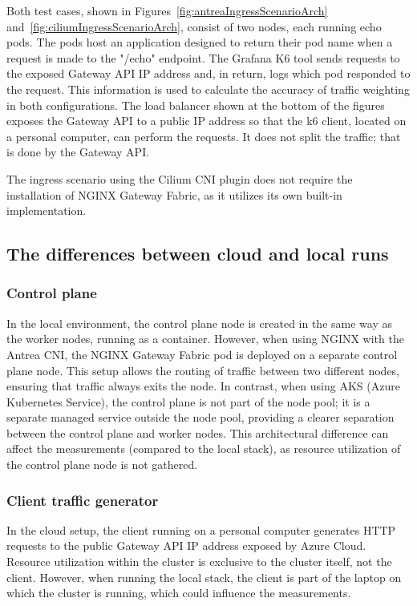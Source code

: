 Both test cases, shown in Figures~\ref{fig:antreaIngressScenarioArch} and~\ref{fig:ciliumIngressScenarioArch}, consist of two nodes, each running echo pods. The pods host an application designed to return their pod name when a request is made to the "/echo" endpoint. The Grafana K6 tool sends requests to the exposed Gateway API IP address and, in return, logs which pod responded to the request. This information is used to calculate the accuracy of traffic weighting in both configurations. The load balancer shown at the bottom of the figures exposes the Gateway API to a public IP address so that the k6 client, located on a personal computer, can perform the requests. It does not split the traffic; that is done by the Gateway API.

The ingress scenario using the Cilium CNI plugin does not require the installation of NGINX Gateway Fabric, as it utilizes its own built-in implementation.


\subsection{The differences between cloud and local runs}
\label{sec:diff}

\subsubsection{Control plane}
\label{sec:cplaneDiff}

In the local environment, the control plane node is created in the same way as the worker nodes, running as a container. However, when using NGINX with the Antrea CNI, the NGINX Gateway Fabric pod is deployed on a separate control plane node. This setup allows the routing of traffic between two different nodes, ensuring that traffic always exits the node. In contrast, when using AKS (Azure Kubernetes Service), the control plane is not part of the node pool; it is a separate managed service outside the node pool, providing a clearer separation between the control plane and worker nodes. This architectural difference can affect the measurements (compared to the local stack), as resource utilization of the control plane node is not gathered.

\subsubsection{Client traffic generator}
\label{sec:clientServerDiff}

In the cloud setup, the client running on a personal computer generates HTTP requests to the public Gateway API IP address exposed by Azure Cloud. Resource utilization within the cluster is exclusive to the cluster itself, not the client. However, when running the local stack, the client is part of the laptop on which the cluster is running, which could influence the measurements.
